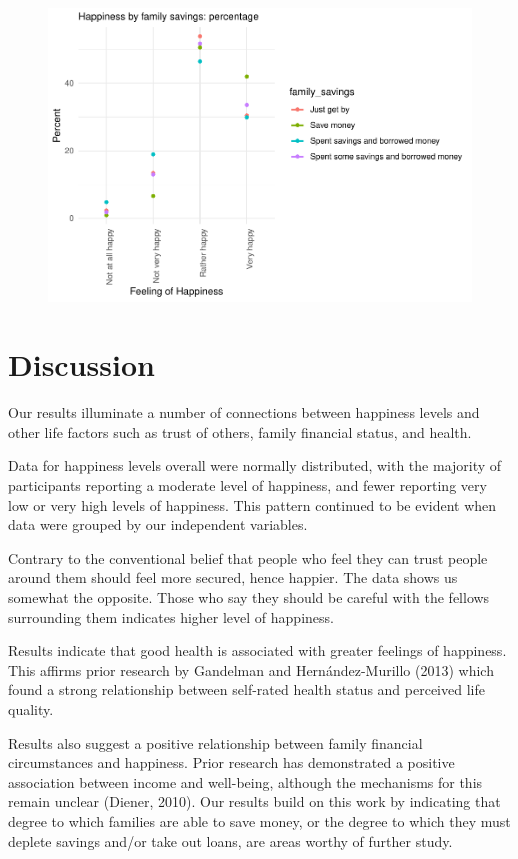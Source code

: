 \documentclass[man, fleqn, noextraspace,floatsintext]{apa6}
\begin{document}
\begin{figure}
\centering
\includegraphics{610_final_files/figure-latex/happiness by family savings tables and figures-1.pdf}
\caption{}
\end{figure}

\section{Discussion}\label{discussion}

Our results illuminate a number of connections between happiness levels
and other life factors such as trust of others, family financial status,
and health.

Data for happiness levels overall were normally distributed, with the
majority of participants reporting a moderate level of happiness, and
fewer reporting very low or very high levels of happiness. This pattern
continued to be evident when data were grouped by our independent
variables.

Contrary to the conventional belief that people who feel they can trust
people around them should feel more secured, hence happier. The data
shows us somewhat the opposite. Those who say they should be careful
with the fellows surrounding them indicates higher level of happiness.

Results indicate that good health is associated with greater feelings of
happiness. This affirms prior research by Gandelman and
Hernández-Murillo (2013) which found a strong relationship between
self-rated health status and perceived life quality.

Results also suggest a positive relationship between family financial
circumstances and happiness. Prior research has demonstrated a positive
association between income and well-being, although the mechanisms for
this remain unclear (Diener, 2010). Our results build on this work by
indicating that degree to which families are able to save money, or the
degree to which they must deplete savings and/or take out loans, are
areas worthy of further study.
\end{document}
